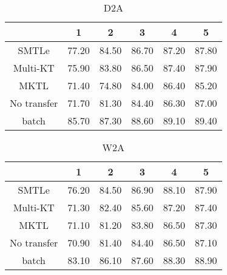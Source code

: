 \begin{table}[htbp]
	\centering
	\caption{D2A}
	\begin{tabular}{cccccc}
		\toprule
		& 1     & 2     & 3     & 4     & 5 \\
		\midrule
		SMTLe & 77.20 & 84.50 & 86.70 & 87.20 & 87.80 \\
		Multi-KT & 75.90 & 83.80 & 86.50 & 87.40 & 87.90 \\
		MKTL  & 71.40 & 74.80 & 84.00 & 86.40 & 85.20 \\
		No transfer & 71.70 & 81.30 & 84.40 & 86.30 & 87.00 \\
		batch & 85.70 & 87.30 & 88.60 & 89.10 & 89.40 \\
		\bottomrule
	\end{tabular}%
\end{table}%
\begin{table}[htbp]
	\centering
	\caption{W2A}
	\begin{tabular}{cccccc}
		\toprule
		& 1     & 2     & 3     & 4     & 5 \\
		\midrule
		SMTLe & 76.20 & 84.50 & 86.90 & 88.10 & 87.90 \\
		Multi-KT & 71.30 & 82.40 & 85.60 & 87.20 & 87.40 \\
		MKTL  & 71.10 & 81.20 & 83.80 & 86.50 & 87.30 \\
		No transfer & 70.90 & 81.40 & 84.40 & 86.50 & 87.10 \\
		batch & 83.10 & 86.10 & 87.60 & 88.30 & 88.90 \\
		\bottomrule
	\end{tabular}%
	\label{tab:addlabel}%
\end{table}%

